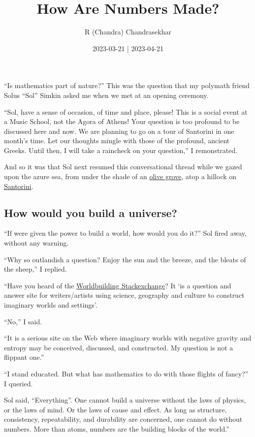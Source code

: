 \documentclass[
  a4paper,
]{article}
\title{How Are Numbers Made?}
\author{R (Chandra) Chandrasekhar}
\date{2023-03-21 | 2023-04-21}
\begin{document}
\maketitle

\thispagestyle{empty}


``Is mathematics part of nature?'' This was the question that my
polymath friend Solus ``Sol'' Simkin asked me when we met at an opening
ceremony.

``Sol, have a sense of occasion, of time and place, please! This is a
social event at a Music School, not the Agora of Athens! Your question
is too profound to be discussed here and now. We are planning to go on a
tour of Santorini in one month's time. Let our thoughts mingle with
those of the profound, ancient Greeks. Until then, I will take a
raincheck on your question,'' I remonstrated.

And so it was that Sol next resumed this conversational thread while we
gazed upon the azure sea, from under the shade of an
\href{http://wedding.beleon.com/media/15172-beleontoursgreeceweddingsantoriniolivegrove.jpg}{olive
grove}, atop a hillock on
\href{https://en.wikipedia.org/wiki/Santorini}{Santorini}.

\subsection{How would you build a
universe?}\label{how-would-you-build-a-universe}

``If were given the power to build a world, how would you do it?'' Sol
fired away, without any warning.

``Why so outlandish a question? Enjoy the sun and the breeze, and the
bleats of the sheep,'' I replied.

``Have you heard of the
\href{https://worldbuilding.stackexchange.com/}{Worldbuilding
Stackexchange}? It `is a question and answer site for writers/artists
using science, geography and culture to construct imaginary worlds and
settings'.

``No,'' I said.

``It is a serious site on the Web where imaginary worlds with negative
gravity and entropy may be conceived, discussed, and constructed. My
question is not a flippant one.''

``I stand educated. But what has mathematics to do with those flights of
fancy?'' I queried.

Sol said, ``Everything''. One cannot build a universe without the laws
of physics, or the laws of mind. Or the laws of cause and effect. As
long as structure, consistency, repeatability, and durability are
concerned, one cannot do without numbers. More than atoms, numbers are
the building blocks of the world.''
\end{document}
